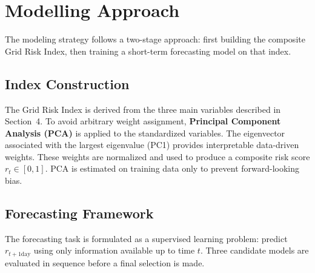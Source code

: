 \documentclass[11pt, a4paper]{article}
\begin{document}
\section{Modelling Approach}

The modeling strategy follows a two-stage approach: first building the composite Grid Risk Index, then training a short-term forecasting model on that index.

\subsection{Index Construction}

The Grid Risk Index is derived from the three main variables described in Section~4. To avoid arbitrary weight assignment, \textbf{Principal Component Analysis (PCA)} is applied to the standardized variables. The eigenvector associated with the largest eigenvalue (PC1) provides interpretable data-driven weights. These weights are normalized and used to produce a composite risk score $r_t \in [0, 1]$. PCA is estimated on training data only to prevent forward-looking bias.

\subsection{Forecasting Framework}

The forecasting task is formulated as a supervised learning problem:
predict $r_{t+1\text{day}}$ using only information available up to time
$t$. Three candidate models are evaluated in sequence before a final
selection is made.
\end{document}
